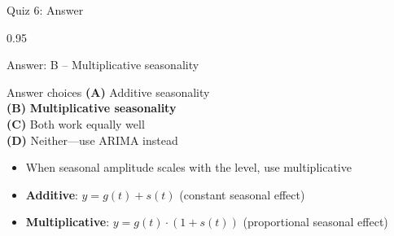 \documentclass[9pt, aspectratio=169, t]{beamer}
\begin{document}
\begin{frame}{Quiz 6: Answer}
    \begin{cminipage}{0.95\textwidth}
    \begin{exampleblock}{Answer: B -- Multiplicative seasonality}

        \vspace{0.1cm}

    \begin{block}{Answer choices}
        \textcolor{MainBlue}{\textbf{(A)}} Additive seasonality \incorrect\\[3pt]
        \textcolor{MainBlue}{\textbf{(B)}} \textbf{\textcolor{Forest}{Multiplicative seasonality}} \correct\\[3pt]
        \textcolor{MainBlue}{\textbf{(C)}} Both work equally well \incorrect\\[3pt]
        \textcolor{MainBlue}{\textbf{(D)}} Neither---use ARIMA instead \incorrect
    \end{block}

        \vspace{0.2cm}

        \begin{itemize}\setlength{\itemsep}{0pt}
            \item When seasonal amplitude scales with the level, use multiplicative
            \item \textbf{Additive}: $y = g(t) + s(t)$ (constant seasonal effect)
            \item \textbf{Multiplicative}: $y = g(t) \cdot (1 + s(t))$ (proportional seasonal effect)
        \end{itemize}
    \end{exampleblock}

    \end{cminipage}
\end{frame}
\end{document}
